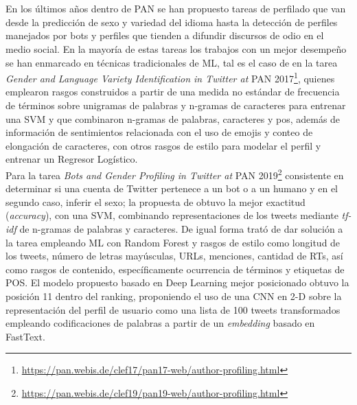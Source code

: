  \\
 \\
 En los últimos años dentro de PAN se han propuesto tareas de perfilado que van desde la predicción de sexo y variedad del idioma  hasta la detección de perfiles manejados por bots y perfiles que tienden a difundir discursos de odio en el medio social. En la mayoría de estas tareas los trabajos con un mejor desempeño se han enmarcado en técnicas tradicionales de ML, tal es el caso de \citep{basile:2017} en la tarea \textit{Gender and Language Variety Identification in Twitter at} PAN 2017\footnote{\url{https://pan.webis.de/clef17/pan17-web/author-profiling.html}}, quienes emplearon rasgos construidos a partir de una medida no estándar de frecuencia de términos sobre unigramas de palabras y n-gramas de caracteres para entrenar una SVM y \citep{martinc:2017}  que combinaron n-gramas de palabras, caracteres y \ac{pos}, además de información de sentimientos relacionada con el uso de emojis y conteo de elongación de caracteres, con otros rasgos de estilo para modelar el perfil y entrenar un Regresor Logístico. 
 \\
 Para la tarea \textit{Bots and Gender Profiling in Twitter at} PAN 2019\footnote{\url{https://pan.webis.de/clef19/pan19-web/author-profiling.html}} consistente en determinar si una cuenta de Twitter pertenece a un bot o a un humano y en el segundo caso, inferir el sexo; la propuesta de \citep{DBLP:conf/clef/Pizarro19} obtuvo la mejor exactitud (\textit{accuracy}), con una SVM, combinando representaciones de los tweets mediante \textit{tf-idf} de n-gramas de palabras y caracteres. De igual forma \citep{DBLP:conf/clef/Johansson19} trató de dar solución a la tarea empleando ML con Random Forest y rasgos de estilo como longitud de los tweets, número de letras mayúsculas, URLs, menciones, cantidad de RTs, así como rasgos de contenido, específicamente ocurrencia de términos y etiquetas de POS. El modelo propuesto basado en Deep Learning mejor posicionado \citep{polignano:2019} obtuvo la posición 11 dentro del ranking, proponiendo el uso de una CNN en 2-D sobre la representación del perfil de usuario como una lista de 100 tweets transformados empleando codificaciones de palabras a partir de un \textit{embedding} basado en FastText.
 \\ 
